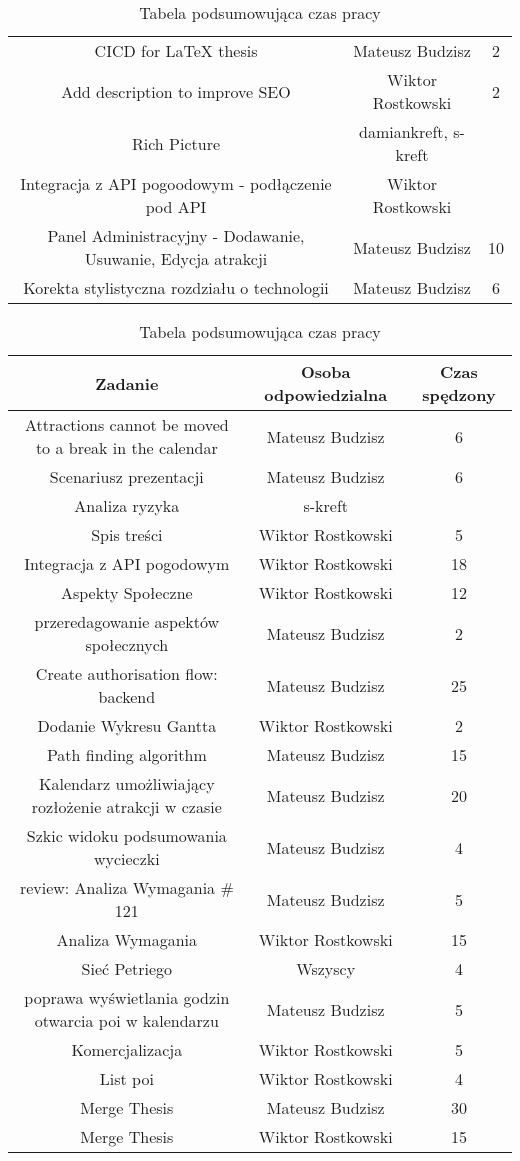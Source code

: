\begin{table}[h!]
\begin{tabular}{|c|c|c|}
CICD for LaTeX thesis	&	Mateusz Budzisz	&	2	\\
Add description to improve SEO	&	Wiktor Rostkowski	&	2	\\
Rich Picture	&	damiankreft, s-kreft	&		\\
Integracja z API pogoodowym - podłączenie pod API	&	Wiktor Rostkowski	&		\\
Panel Administracyjny - Dodawanie, Usuwanie, Edycja atrakcji	&	Mateusz Budzisz	&	10	\\
Korekta stylistyczna rozdziału o technologii	&	Mateusz Budzisz	&	6	\\
\hline
\end{tabular}
\caption{Tabela podsumowująca czas pracy}
\label{tab:podsumowanie prac}
\end{table}

\begin{table}[h!]
    \centering
    \begin{tabular}{|c|c|c|}
        \hline					
        Zadanie	&	Osoba odpowiedzialna	& Czas spędzony\\
        \hline		
Attractions cannot be moved to a  break in the calendar	&	Mateusz Budzisz	&	6	\\
Scenariusz prezentacji	&	Mateusz Budzisz	&	6	\\
Analiza ryzyka	&	s-kreft	&		\\
Spis treści	&	Wiktor Rostkowski	&	5	\\
Integracja z API pogodowym 	&	Wiktor Rostkowski	&	18	\\
Aspekty Społeczne	&	Wiktor Rostkowski	&	12	\\
przeredagowanie aspektów społecznych	&	Mateusz Budzisz	&	2	\\
Create authorisation flow: backend 	&	Mateusz Budzisz	&	25	\\
Dodanie Wykresu Gantta	&	Wiktor Rostkowski	&	2	\\
Path finding algorithm	&	Mateusz Budzisz	&	15	\\
Kalendarz umożliwiający rozłożenie atrakcji w czasie	&	Mateusz Budzisz	&	20	\\
Szkic widoku podsumowania wycieczki	&	Mateusz Budzisz	&	4	\\
review: Analiza Wymagania \# 121	&	Mateusz Budzisz	&	5	\\
Analiza Wymagania	&	Wiktor Rostkowski	&	15	\\
Sieć Petriego	&	Wszyscy	&	4	\\
poprawa wyświetlania godzin otwarcia poi w kalendarzu	&	Mateusz Budzisz	&	5	\\
Komercjalizacja	&	Wiktor Rostkowski	&	5	\\
List poi	&	Wiktor Rostkowski	&	4	\\
Merge Thesis	&	Mateusz Budzisz	&	30	\\
Merge Thesis	&	Wiktor Rostkowski	&	15	\\
\hline
\end{tabular}
\caption{Tabela podsumowująca czas pracy}
\label{tab:podsumowanie prac}
\end{table}